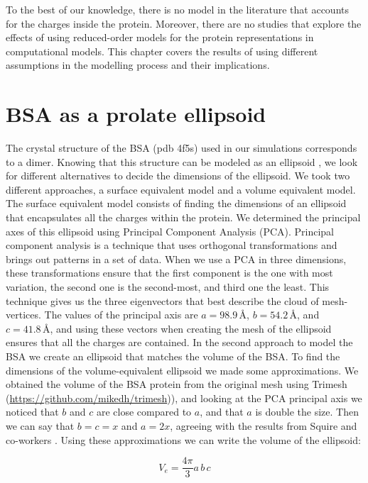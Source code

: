 To the best of our knowledge, there is no model in the literature that accounts for the charges inside the protein. 
Moreover, there are no studies that explore the effects of using reduced-order models for the protein representations 
in computational models. This chapter covers the results of using different assumptions in the modelling process and their implications.

\section{BSA as a prolate ellipsoid} \label{sec:ell_study}

The crystal structure of the BSA (pdb 4f5s) used in our simulations corresponds
to a dimer. Knowing that this structure can be modeled as an ellipsoid \cite{SquireETal1968},
we look for different alternatives to decide the dimensions of the ellipsoid. We took two
different approaches, a surface equivalent model and a volume equivalent model. The surface equivalent
model consists of finding the dimensions of an ellipsoid that encapsulates all the charges within the protein. We determined the principal axes of this
ellipsoid using Principal Component Analysis (PCA). Principal component analysis is a technique that
uses orthogonal transformations and brings out patterns in a set of data. When 
we use a PCA in three dimensions, these transformations ensure that the first 
component is the one with most variation, the second one is the second-most, and
third one the least. This technique gives us the three eigenvectors that best 
describe the cloud of mesh-vertices. The values of the principal axis are $a=98.9\, \text{\AA}$, $b=54.2\, \text{\AA}$, and $c=41.8\, \text{\AA}$, and 
using these vectors when creating the mesh of the ellipsoid ensures that all the charges are contained.
In the second approach to model the BSA we create an ellipsoid that matches the volume of the BSA. To find the dimensions 
of the volume-equivalent ellipsoid we made some approximations. We obtained the volume of the BSA protein from the original mesh
using Trimesh (\url{https://github.com/mikedh/trimesh})), and looking at the PCA principal axis we noticed that $b$ and $c$ are close 
compared to $a$, and that $a$ is double the size. Then we can say that $b=c=x$ and $a=2x$, agreeing with the results from Squire and co-workers
\cite{SquireETal1968}. Using these approximations we can write the volume of the ellipsoid:

\begin{equation}
    V_e = \frac{4\pi}{3}a\,b\,c 
\end{equation}

